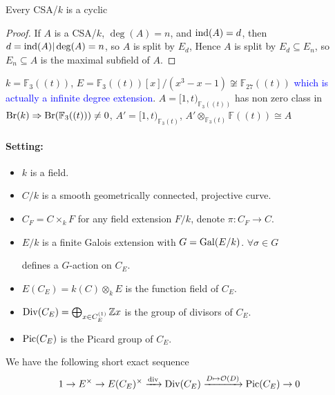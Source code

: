 \documentclass[a4paper,10pt]{article}
\begin{document}
\begin{corollary}
Every CSA/$k$ is a cyclic
\end{corollary}

\begin{proof}
If $A$ is a CSA/$k$, $\deg(A)=n$, and $\operatorname{ind}(A)=d$, then $d=\operatorname{ind}(A)|\deg(A)=n$, so $A$ is split by $E_d$, Hence $A$ is split by $E_d\subseteq E_n$, so $E_n\subseteq A$ is the maximal subfield of $A$.
\end{proof}

\begin{example}
$k=\mathbb F_3((t))$, $E=\mathbb F_3((t))[x]/(x^3-x-1)\not\cong\mathbb F_{27}((t))$ \textcolor{blue}{which is actually a infinite degree extension}. $A=[1,t)_{\mathbb F_3((t))}$ has non zero class in $\operatorname{Br}(k)\Rightarrow\operatorname{Br}(\mathbb F_3((t)))\neq0$, $A'=[1,t)_{\mathbb F_3(t)}$, $A'\otimes_{\mathbb F_3(t)}\mathbb F((t))\cong A$
\end{example}

\paragraph{Setting:}
\begin{itemize}
\item $k$ is a field.
\item $C/k$ is a smooth geometrically connected, projective curve.
\item $C_F=C\times_kF$ for any field extension $F/k$, denote $\pi:C_F\to C$.
\item $E/k$ is a finite Galois extension with $G=\operatorname{Gal}(E/k)$. $\forall\sigma\in G$
\begin{center}
\end{center}
defines a $G$-action on $C_E$.
\item $E(C_E)=k(C)\otimes_kE$ is the function field of $C_E$.
\item $\operatorname{Div}(C_E)=\bigoplus_{x\in C_E^{(1)}}\mathbb Zx$ is the group of divisors of $C_E$.
\item $\operatorname{Pic}(C_E)$ is the Picard group of $C_E$.
\end{itemize}

We have the following short exact sequence
\begin{equation}\label{14:08-04/27/2022}
1\to E^\times\to E(C_E)^\times\xrightarrow{\operatorname{div}}\operatorname{Div}(C_E)\xrightarrow{D\mapsto\mathcal O(D)}\operatorname{Pic}(C_E)\to0
\end{equation}
\end{document}
